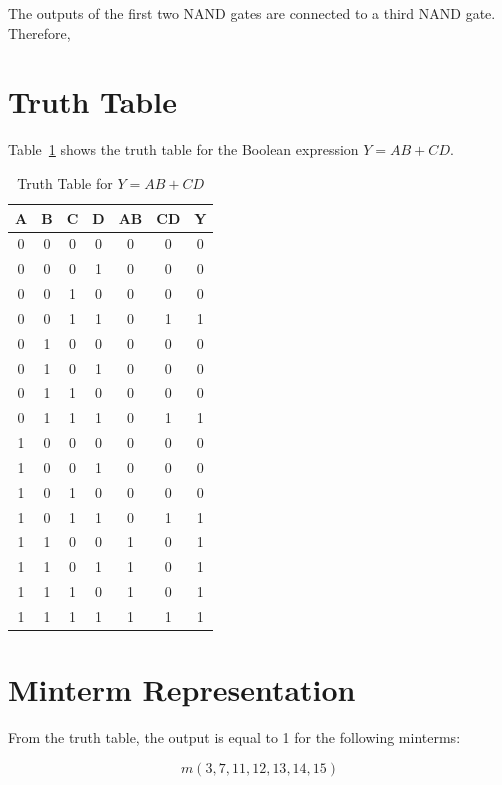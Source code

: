 \documentclass[12pt,a4paper]{article}
\begin{document}
The outputs of the first two NAND gates are connected to a third NAND gate. Therefore,


\section*{Truth Table}

Table~\ref{tab:truth_table} shows the truth table for the Boolean expression
\(Y = AB + CD\).

\begin{table}[H]
\centering
\caption{Truth Table for \(Y = AB + CD\)}
\label{tab:truth_table}
\begin{tabular}{|c|c|c|c|c|c|c|}
\hline
A & B & C & D & AB & CD & Y \\ \hline
0 & 0 & 0 & 0 & 0 & 0 & 0 \\ \hline
0 & 0 & 0 & 1 & 0 & 0 & 0 \\ \hline
0 & 0 & 1 & 0 & 0 & 0 & 0 \\ \hline
0 & 0 & 1 & 1 & 0 & 1 & 1 \\ \hline
0 & 1 & 0 & 0 & 0 & 0 & 0 \\ \hline
0 & 1 & 0 & 1 & 0 & 0 & 0 \\ \hline
0 & 1 & 1 & 0 & 0 & 0 & 0 \\ \hline
0 & 1 & 1 & 1 & 0 & 1 & 1 \\ \hline
1 & 0 & 0 & 0 & 0 & 0 & 0 \\ \hline
1 & 0 & 0 & 1 & 0 & 0 & 0 \\ \hline
1 & 0 & 1 & 0 & 0 & 0 & 0 \\ \hline
1 & 0 & 1 & 1 & 0 & 1 & 1 \\ \hline
1 & 1 & 0 & 0 & 1 & 0 & 1 \\ \hline
1 & 1 & 0 & 1 & 1 & 0 & 1 \\ \hline
1 & 1 & 1 & 0 & 1 & 0 & 1 \\ \hline
1 & 1 & 1 & 1 & 1 & 1 & 1 \\ \hline
\end{tabular}
\end{table}

\section*{Minterm Representation}

From the truth table, the output is equal to 1 for the following minterms:

\begin{equation}
m(3,7,11,12,13,14,15)
\end{equation}
\end{document}

